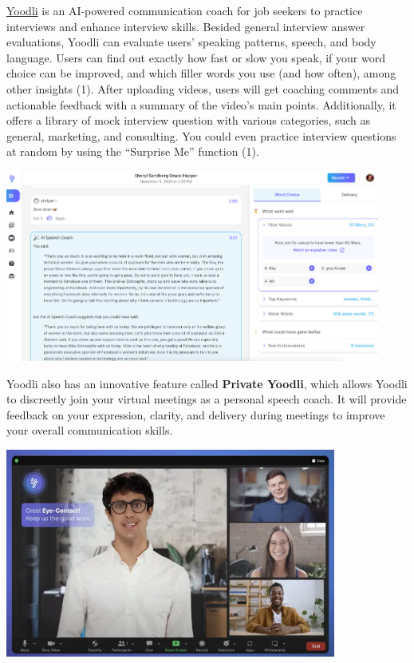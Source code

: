 \documentclass[
]{book}
\begin{document}
\href{https://app.yoodli.ai/}{Yoodli} is an AI-powered communication coach for job seekers to practice interviews and enhance interview skills. Besided general interview answer evaluations, Yoodli can evaluate users' speaking patterns, speech, and body language. Users can find out exactly how fast or slow you speak, if your word choice can be improved, and which filler words you use (and how often), among other insights (1). After uploading videos, users will get coaching comments and actionable feedback with a summary of the video's main points. Additionally, it offers a library of mock interview question with various categories, such as general, marketing, and consulting. You could even practice interview questions at random by using the ``Surprise Me'' function (1).

\includegraphics[width=4.85417in,height=\textheight]{yoodli pic 1.png}

Yoodli also has an innovative feature called \textbf{Private Yoodli}, which allows Yoodli to discreetly join your virtual meetings as a personal speech coach. It will provide feedback on your expression, clarity, and delivery during meetings to improve your overall communication skills.

\includegraphics[width=4.28125in,height=\textheight]{yoodli pic 2.png}
\end{document}
